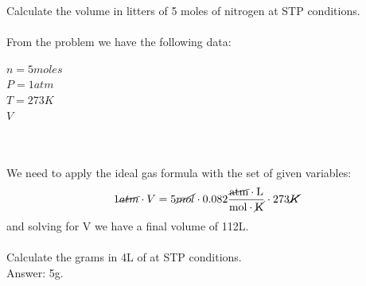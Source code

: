 \documentclass[main.tex]{subfiles}
\begin{document}
\begin{description}
\begin{equation*}
\end{equation*}
\begin{example} %
Calculate the volume in litters of 5 moles of nitrogen at STP conditions.
\\
\\
From the problem we have the following data:
\begin{tcbitemize}[raster columns=3, raster rows=3, enhanced, sharp corners, raster equal height=rows, raster force size=false, raster column skip=0pt, raster row skip = 0pt]
\tcbitem[blankest, width=1cm]
\tcbitem[header = helpful]
\texta
\tcbitem[header = harmful]
\textb
\tcbitem[firstcol = internal]
\textcn
\tcbitem[swotbox = G]
$n=5 moles$\\
$P=1atm$\\
$T=273K$\\
\tcbitem[swotbox = A]
$V$\\
\\
\\
\end{tcbitemize}%
We need to apply the ideal gas formula with the set of given variables:
\begin{equation*}
1 \cancel{atm}\cdot V=5\cancel{mol}\cdot 0.082\frac{\cancel{\text{atm}}\cdot \text{L}}{\text{mol}\cdot \cancel{\text{K}}}\cdot 273\cancel{K}
\end{equation*}
and solving for V we have a final volume of 112L.
\\
\faDiamond\ \\
Calculate the grams in 4L of  at STP conditions.
\\
\flushright Answer: 5g.
\end{example}%

\end{description}
\end{document}
